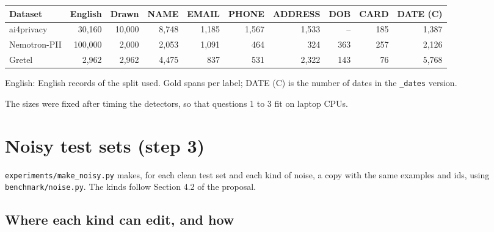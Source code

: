 \documentclass[10pt,a4paper]{article}
\newcommand{\file}[1]{\texttt{#1}}
\begin{document}
{\small\setlength{\tabcolsep}{4.5pt}
\begin{tabular}{@{}lrrrrrrrrr@{}}
\toprule
Dataset & English & Drawn & NAME & EMAIL & PHONE & ADDRESS & DOB & CARD & DATE (C) \\
\midrule
ai4privacy & 30,160 & 10,000 & 8,748 & 1,185 & 1,567 & 1,533 & -- & 185 & 1,387 \\
Nemotron-PII & 100,000 & 2,000 & 2,053 & 1,091 & 464 & 324 & 363 & 257 & 2,126 \\
Gretel & 2,962 & 2,962 & 4,475 & 837 & 531 & 2,322 & 143 & 76 & 5,768 \\
\bottomrule
\end{tabular}}

English: English records of the split used. Gold spans per label; DATE (C) is the number of dates
in the \file{\_dates} version.

The sizes were fixed after timing the detectors, so that questions 1 to 3 fit on laptop CPUs.

\section{Noisy test sets (step 3)}

\file{experiments/make\_noisy.py} makes, for each clean test set and each kind of noise, a copy
with the same examples and ids, using \file{benchmark/noise.py}. The kinds follow Section 4.2 of
the proposal.

\subsection{Where each kind can edit, and how}
\end{document}

